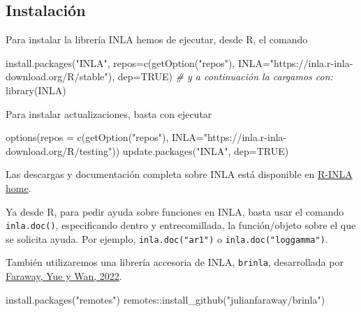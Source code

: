 \documentclass[
]{book}
\newenvironment{Shaded}{\begin{snugshade}}{\end{snugshade}}
\newcommand{\AttributeTok}[1]{\textcolor[rgb]{0.77,0.63,0.00}{#1}}
\newcommand{\CommentTok}[1]{\textcolor[rgb]{0.56,0.35,0.01}{\textit{#1}}}
\newcommand{\ConstantTok}[1]{\textcolor[rgb]{0.00,0.00,0.00}{#1}}
\newcommand{\FunctionTok}[1]{\textcolor[rgb]{0.00,0.00,0.00}{#1}}
\newcommand{\NormalTok}[1]{#1}
\newcommand{\SpecialCharTok}[1]{\textcolor[rgb]{0.00,0.00,0.00}{#1}}
\newcommand{\StringTok}[1]{\textcolor[rgb]{0.31,0.60,0.02}{#1}}
\begin{document}
\hypertarget{instalaciuxf3n}{%
\subsection{Instalación}\label{instalaciuxf3n}}

Para instalar la librería INLA hemos de ejecutar, desde R, el comando

\begin{Shaded}
\begin{Highlighting}[]
\FunctionTok{install.packages}\NormalTok{(}\StringTok{"INLA"}\NormalTok{, }\AttributeTok{repos=}\FunctionTok{c}\NormalTok{(}\FunctionTok{getOption}\NormalTok{(}\StringTok{"repos"}\NormalTok{), }
                \AttributeTok{INLA=}\StringTok{"https://inla.r{-}inla{-}download.org/R/stable"}\NormalTok{), }
                \AttributeTok{dep=}\ConstantTok{TRUE}\NormalTok{)}
\CommentTok{\# y a continuación la cargamos con:}
\FunctionTok{library}\NormalTok{(INLA)}
\end{Highlighting}
\end{Shaded}

Para instalar actualizaciones, basta con ejecutar

\begin{Shaded}
\begin{Highlighting}[]
\FunctionTok{options}\NormalTok{(}\AttributeTok{repos =} \FunctionTok{c}\NormalTok{(}\FunctionTok{getOption}\NormalTok{(}\StringTok{"repos"}\NormalTok{), }
                  \AttributeTok{INLA=}\StringTok{"https://inla.r{-}inla{-}download.org/R/testing"}\NormalTok{))}
\FunctionTok{update.packages}\NormalTok{(}\StringTok{"INLA"}\NormalTok{, }\AttributeTok{dep=}\ConstantTok{TRUE}\NormalTok{)}
\end{Highlighting}
\end{Shaded}

Las descargas y documentación completa sobre INLA está disponible en
\href{http://www.r-inla.org/home}{R-INLA home}.

Ya desde R, para pedir ayuda sobre funciones en INLA, basta usar el
comando \texttt{inla.doc()}, especificando dentro y entrecomillada, la
función/objeto sobre el que se solicita ayuda. Por ejemplo,
\texttt{inla.doc("ar1")} o \texttt{inla.doc("loggamma")}.

También utilizaremos una librería accesoria de INLA, \texttt{brinla}, desarrollada por \href{https://rdrr.io/github/julianfaraway/brinla/}{Faraway, Yue y Wan, 2022}.

\begin{Shaded}
\begin{Highlighting}[]
\FunctionTok{install.packages}\NormalTok{(}\StringTok{"remotes"}\NormalTok{)}
\NormalTok{remotes}\SpecialCharTok{::}\FunctionTok{install\_github}\NormalTok{(}\StringTok{"julianfaraway/brinla"}\NormalTok{)}
\end{Highlighting}
\end{Shaded}
\end{document}
